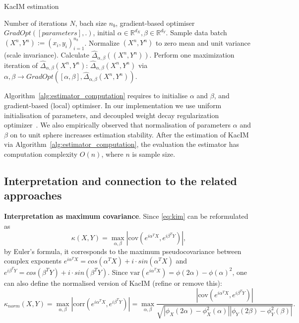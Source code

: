 \documentclass{article}
\newcommand{\cov}{\mathrm{cov}}
\newcommand{\corr}{\mathrm{corr}}
\newcommand{\var}{\mathrm{var}}
\begin{document}
\begin{algorithm}
	\caption{KacIM estimation}\label{alg:estimator_computation}
	\begin{algorithmic}
		\Require Number of iterations $N$, bach size $n_{b}$, gradient-based optimiser $GradOpt([parameters],.)$, initial $\alpha \in \mathbb{R}^{d_{X}}, \beta \in \mathbb{R}^{d_{Y}}$.
		\State Sample data batch $(X^{n},Y^{n}):=(x_{i},y_{i})_{i=1}^{n_{b}}$.
		\State Normalize $(X^{n},Y^{n})$ to zero mean and unit variance (scale invariance).
		\State Calculate  $\widehat{\Delta}_{\alpha, \beta}((X^{n},Y^{n}))$.
		\State Perform one maximization iteration of $\widehat{\Delta}_{\alpha, \beta}(X^{n},Y^{n})$: $\widehat{\Delta}_{\alpha, \beta}(X^{n},Y^{n})$ via $\alpha, \beta \rightarrow GradOpt([\alpha, \beta], \widehat{\Delta}_{\alpha, \beta}(X^{n},Y^{n}))$.
		\EndFor
	\end{algorithmic}
\end{algorithm}



Algorithm~\ref{alg:estimator_computation} requires to initialise $\alpha$ and $\beta$, and gradient-based (local) optimiser. In our implementation we use uniform initialisation of parameters, and decoupled weight decay regularization optimizer~\cite{Loshchilov2019DecoupledWD}. 
We also empirically observed that normalisation of parameters $\alpha$ and $\beta$ on to unit sphere increases estimation stability. After the estimation of KacIM via Algorithm~\ref{alg:estimator_computation}, the evaluation the estimator  has computation complexity $O(n)$, where $n$ is sample size.



\subsection{Interpretation and connection to the related approaches}
\textbf{Interpretation as maximum covariance}. Since \eqref{eq:kim} can be reformulated as
\begin{equation}
\kappa(X,Y) = \max_{\alpha,\beta} |\cov(e^{i\alpha^{T}X},e^{i\beta^{T}Y})|,
\end{equation}
by Euler's formula, it corresponds to the maximum pseudocovariance between complex exponents $e^{i\alpha^{T}X} = cos(\alpha^{T}X) + i \cdot sin(\alpha^{T}X)$ and $e^{i\beta^{T}Y} = cos(\beta^{T}Y) + i \cdot sin(\beta^{T}Y)$.
Since $\var(e^{i\alpha^{T}X}) = \phi(2\alpha) - \phi(\alpha)^2$, one can also define the normalised version of KacIM (refine or remove this):
\begin{equation}
\kappa_{norm}(X,Y) = \max_{\alpha,\beta} |\corr(e^{i\alpha^{T}X},e^{i\beta^{T}Y})| = \max_{\alpha,\beta}  \frac{|\cov(e^{i\alpha^{T}X},e^{i\beta^{T}Y})|}{\sqrt{|\phi_{X}(2\alpha)-\phi_{X}^{2}(\alpha)||\phi_{Y}(2\beta)-\phi_{Y}^{2}(\beta)|}}.
\end{equation}
\end{document}
